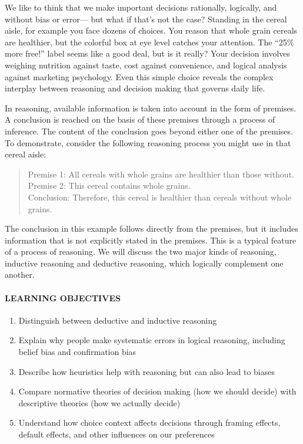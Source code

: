 \documentclass[
]{krantz}
\providecommand{\tightlist}{%
  \setlength{\itemsep}{0pt}\setlength{\parskip}{0pt}}
\begin{document}
We like to think that we make important decisions rationally, logically, and without bias or error--- but what if that's not the case? Standing in the cereal aisle, for example you face dozens of choices. You reason that whole grain cereals are healthier, but the colorful box at eye level catches your attention. The ``25\% more free!'' label seems like a good deal, but is it really? Your decision involves weighing nutrition against taste, cost against convenience, and logical analysis against marketing psychology. Even this simple choice reveals the complex interplay between reasoning and decision making that governs daily life.

In reasoning, available information is taken into account in the form of premises. A conclusion is reached on the basis of these premises through a process of inference. The content of the conclusion goes beyond either one of the premises. To demonstrate, consider the following reasoning process you might use in that cereal aisle:

\begin{quote}
Premise 1: All cereals with whole grains are healthier than those without.\\
Premise 2: This cereal contains whole grains.\\
Conclusion: Therefore, this cereal is healthier than cereals without whole grains.
\end{quote}

The conclusion in this example follows directly from the premises, but it includes information that is not explicitly stated in the premises. This is a typical feature of a process of reasoning. We will discuss the two major kinds of reasoning, inductive reasoning and deductive reasoning, which logically complement one another.

\paragraph*{LEARNING OBJECTIVES}\label{learning-objectives-8}

\begin{enumerate}
\def\labelenumi{\arabic{enumi}.}
\tightlist
\item
  Distinguish between deductive and inductive reasoning
\item
  Explain why people make systematic errors in logical reasoning, including belief bias and confirmation bias
\item
  Describe how heuristics help with reasoning but can also lead to biases
\item
  Compare normative theories of decision making (how we should decide) with descriptive theories (how we actually decide)
\item
  Understand how choice context affects decisions through framing effects, default effects, and other influences on our preferences
\end{enumerate}
\end{document}
